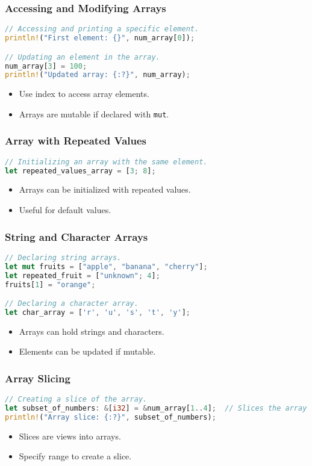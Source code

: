 \documentclass[aspectratio=169, table]{beamer}
\begin{document}
\begin{frame}[fragile]
\frametitle{Accessing and Modifying Arrays}
\begin{lstlisting}[language=Rust]
// Accessing and printing a specific element.
println!("First element: {}", num_array[0]);

// Updating an element in the array.
num_array[3] = 100;
println!("Updated array: {:?}", num_array);
\end{lstlisting}
\begin{itemize}
\item Use index to access array elements.
\item Arrays are mutable if declared with \texttt{mut}.
\end{itemize}
\end{frame}

\begin{frame}[fragile]
\frametitle{Array with Repeated Values}
\begin{lstlisting}[language=Rust]
// Initializing an array with the same element.
let repeated_values_array = [3; 8];
\end{lstlisting}
\begin{itemize}
\item Arrays can be initialized with repeated values.
\item Useful for default values.
\end{itemize}
\end{frame}

\begin{frame}[fragile]
\frametitle{String and Character Arrays}
\begin{lstlisting}[language=Rust]
// Declaring string arrays.
let mut fruits = ["apple", "banana", "cherry"];
let repeated_fruit = ["unknown"; 4];
fruits[1] = "orange";

// Declaring a character array.
let char_array = ['r', 'u', 's', 't', 'y'];
\end{lstlisting}
\begin{itemize}
\item Arrays can hold strings and characters.
\item Elements can be updated if mutable.
\end{itemize}
\end{frame}

\begin{frame}[fragile]
\frametitle{Array Slicing}
\begin{lstlisting}[language=Rust]
// Creating a slice of the array.
let subset_of_numbers: &[i32] = &num_array[1..4];  // Slices the array from index 1 to 3.
println!("Array slice: {:?}", subset_of_numbers);
\end{lstlisting}
\begin{itemize}
\item Slices are views into arrays.
\item Specify range to create a slice.
\end{itemize}
\end{frame}
\end{document}
